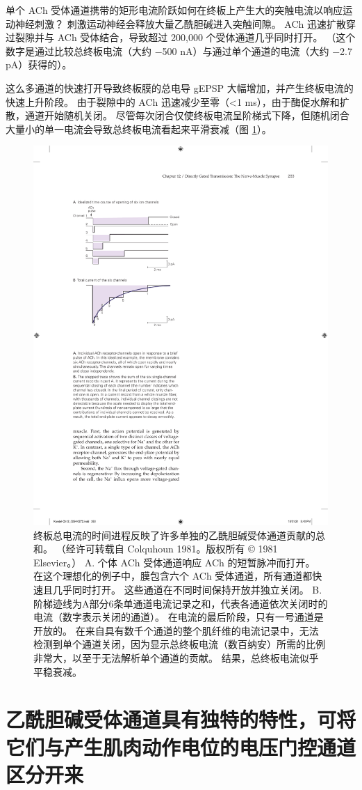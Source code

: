 单个 ACh 受体通道携带的矩形电流阶跃如何在终板上产生大的突触电流以响应运动神经刺激？ 
刺激运动神经会释放大量乙酰胆碱进入突触间隙。 
ACh 迅速扩散穿过裂隙并与 ACh 受体结合，导致超过 200,000 个受体通道几乎同时打开。 
（这个数字是通过比较总终板电流（大约 −500 nA）与通过单个通道的电流（大约 −2.7 pA）获得的）。


这么多通道的快速打开导致终板膜的总电导 gEPSP 大幅增加，并产生终板电流的快速上升阶段。 
由于裂隙中的 ACh 迅速减少至零（<1 ms），由于酶促水解和扩散，通道开始随机关闭。 
尽管每次闭合仅使终板电流呈阶梯式下降，但随机闭合大量小的单一电流会导致总终板电流看起来平滑衰减（图 \ref{fig:12_8}）。


\begin{figure}[htbp]
	\centering
	\includegraphics[width=0.5\linewidth]{chap12/fig_12_8}
	\caption{终板总电流的时间进程反映了许多单独的乙酰胆碱受体通道贡献的总和。 （经许可转载自 Colquhoun 1981。版权所有 © 1981 Elsevier。） A. 个体 ACh 受体通道响应 ACh 的短暂脉冲而打开。 在这个理想化的例子中，膜包含六个 ACh 受体通道，所有通道都快速且几乎同时打开。 这些通道在不同时间保持开放并独立关闭。 B.阶梯迹线为A部分6条单通道电流记录之和，代表各通道依次关闭时的电流（数字表示关闭的通道）。 在电流的最后阶段，只有一号通道是开放的。 在来自具有数千个通道的整个肌纤维的电流记录中，无法检测到单个通道关闭，因为显示总终板电流（数百纳安）所需的比例非常大，以至于无法解析单个通道的贡献。 结果，总终板电流似乎平稳衰减。}
	\label{fig:12_8}
\end{figure}



\section{乙酰胆碱受体通道具有独特的特性，可将它们与产生肌肉动作电位的电压门控通道区分开来}

